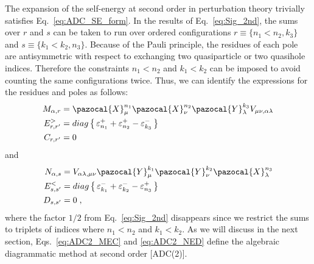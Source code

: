 The expansion of the self-energy at second order in perturbation theory trivially satisfies Eq.~\eqref{eq:ADC_SE_form}. In the results  of Eq.~\eqref{eq:Sig_2nd}, the sums over $r$ and $s$ can be taken to run over ordered configurations $r\equiv\{n_1 < n_2,k_3\}$ and  $s\equiv\{k_1 < k_2, n_3\}$. Because of the Pauli principle, the residues of each pole are antisymmetric with respect to exchanging two quasiparticle or two quasihole indices. Therefore the constraints  $n_1 < n_2$ and  $k_1 < k_2$  can be imposed to avoid counting the same configurations twice. Thus, we can identify the expressions for the residues and poles as follows:
\begin{subequations}
 \label{eq:ADC2_MEC}
\begin{align}
 M_{\alpha,r} ={}& %
     \pazocal{X}^{n_1}_\mu \pazocal{X}^{n_2}_\nu  \pazocal{Y}^{k_3}_\lambda  V_{\mu \nu, \alpha \lambda}
  \label{eq:ADC2_M}  \\
 E^>_{r,r'} ={}& diag \left\{ \,\varepsilon^+_{n_1} + \varepsilon^+_{n_2} - \varepsilon^-_{k_3}  \, \right\}
 \label{eq:ADC2_Efw}  \\
 C_{r,r'} ={}& 0
 \label{eq:ADC2_C}
 \end{align}
\end{subequations}
and 
\begin{subequations}
\label{eq:ADC2_NED}
\begin{align}
 N_{\alpha,s}  ={}& V_{\alpha \lambda, \mu \nu} \pazocal{Y}^{k_1}_\mu \pazocal{Y}^{k_2}_\nu \pazocal{X}^{n_3}_\lambda  
   \label{eq:ADC2_N}  \\
 E^<_{s,s'}  ={}& diag \left\{ \, \varepsilon^-_{k_1} + \varepsilon^-_{k_2} - \varepsilon^+_{n_3} \, \right\} 
   \label{eq:ADC2_Ebk}  \\
 D_{s,s'}  ={}& 0  \; ,
  \label{eq:ADC2_D}
\end{align}
\end{subequations}
where the factor $1/2$ from Eq.~\eqref{eq:Sig_2nd} disappears since we restrict the sums to triplets of indices where  $n_1<n_2$ and $k_1<k_2$.
As we will discuss in the next section, Eqs.~\eqref{eq:ADC2_MEC} and \eqref{eq:ADC2_NED} define the algebraic diagrammatic method at second order [ADC(2)].


